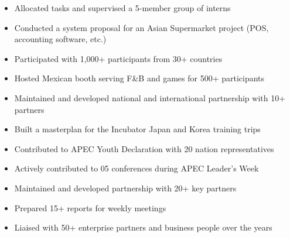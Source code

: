 \documentclass[10pt,a4paper,ragged2e]{altacv}
\begin{document}
\begin{itemize}
	\item Allocated tasks and supervised a 5-member group of interns
	\item Conducted a system proposal for an Asian Supermarket project (POS, accounting software, etc.)
\end{itemize}

\divider

\begin{itemize}
	\item Participated with 1,000+ participants from 30+ countries
	\item Hosted Mexican booth serving F\&B and games for 500+ participants
\end{itemize}

\divider

\begin{itemize}
	\item Maintained and developed national and international partnership with 10+ partners
	\item Built a masterplan for the Incubator Japan and Korea training trips 
\end{itemize}

\divider

\begin{itemize}
	\item Contributed to APEC Youth Declaration with 20 nation representatives
	\item Actively contributed to 05 conferences during APEC Leader's Week
\end{itemize}

\divider

\begin{itemize}
	\item Maintained and developed partnership with 20+ key partners
	\item Prepared 15+ reports for weekly meetings
	\item Liaised with 50+ enterprise partners and business people over the years
\end{itemize}
\end{document}
